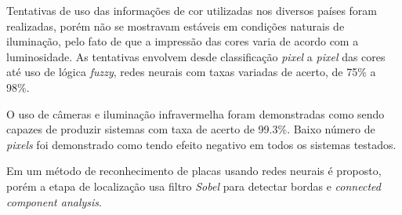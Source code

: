 Tentativas de uso das informações de cor utilizadas nos diversos
países foram realizadas, porém não se mostravam estáveis em condições
naturais de iluminação, pelo fato de que a impressão das cores varia de
acordo com a luminosidade. As tentativas envolvem desde classificação
\emph{pixel} a \emph{pixel} das cores até uso de lógica \emph{fuzzy}, redes
neurais com taxas variadas de acerto, de 75\% a 98\%.

O uso de câmeras e iluminação infravermelha foram demonstradas
como sendo capazes de produzir sistemas com taxa de acerto de 99.3\%.
Baixo número de \emph{pixels} foi demonstrado como tendo efeito negativo em
todos os sistemas testados.

Em  um método de reconhecimento de placas usando
redes neurais é proposto, porém a etapa de localização usa filtro \emph{Sobel}
para detectar bordas e \emph{connected component analysis}.

